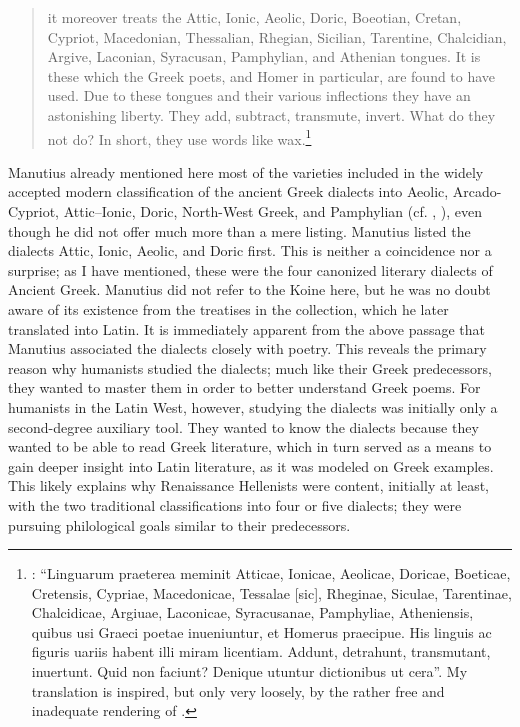 \begin{quote}
it moreover treats the Attic, Ionic, Aeolic, Doric, Boeotian, Cretan, Cypriot, Macedonian, Thessalian, Rhegian, Sicilian, Tarentine, Chalcidian, Argive, Laconian, Syracusan, Pamphylian, and Athenian tongues. It is these which the Greek poets, and Homer in particular, are found to have used. Due to these tongues and their various inflections they have an astonishing liberty. They add, subtract, transmute, invert. What do they not do? In short, they use words like wax.\footnote{\citet[*.ii\textsc{\textsuperscript{v}}]{Manutius1496Aldus}: “Linguarum praeterea meminit Atticae, Ionicae, Aeolicae, Doricae, Boeticae, Cretensis, Cypriae, Macedonicae, Tessalae [sic], Rheginae, Siculae, Tarentinae, Chalcidicae, Argiuae, Laconicae, Syracusanae, Pamphyliae, Atheniensis, quibus usi Graeci poetae inueniuntur, et Homerus praecipue. His linguis ac figuris uariis habent illi miram licentiam. Addunt, detrahunt, transmutant, inuertunt. Quid non faciunt? Denique utuntur dictionibus ut cera”. My translation is inspired, but only very loosely, by the rather free and inadequate rendering of \citet[12]{Bean1958}.} 
\end{quote}

Manutius already mentioned here most of the varieties included in the widely accepted modern classification of the ancient Greek dialects into Aeolic, Arcado-Cypriot, Attic–Ionic, Doric, North-West Greek, and Pamphylian (cf. , ), even though he did not offer much more than a mere listing. Manutius listed the dialects Attic, Ionic, Aeolic, and Doric first. This is neither a coincidence nor a surprise; as I have mentioned, these were the four canonized literary dialects of Ancient Greek. Manutius did not refer to the Koine here, but he was no doubt aware of its existence from the treatises in the collection, which he later translated into Latin. It is immediately apparent from the above passage that Manutius associated the dialects closely with poetry. This reveals the primary reason why humanists studied the dialects; much like their Greek predecessors, they wanted to master them in order to better understand Greek poems. For humanists in the Latin West, however, studying the dialects was initially only a second-degree auxiliary tool. They wanted to know the dialects because they wanted to be able to read Greek literature, which in turn served as a means to gain deeper insight into Latin literature, as it was modeled on Greek examples. This likely explains why Renaissance Hellenists were content, initially at least, with the two traditional classifications into four or five dialects; they were pursuing philological goals similar to their predecessors.

